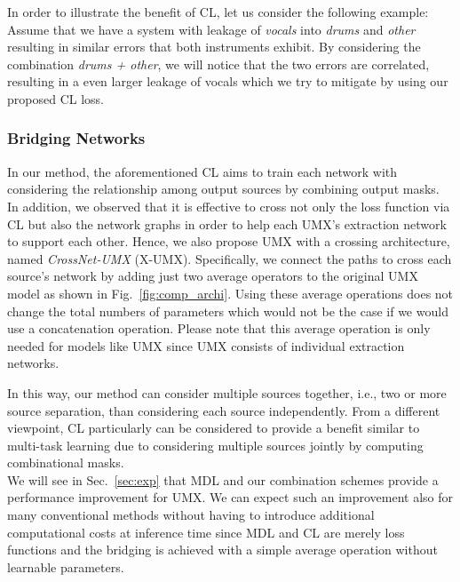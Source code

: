 \documentclass{article}
\begin{document}
In order to illustrate the benefit of CL, let us consider the following example: Assume that we have a system with leakage of \emph{vocals} into \emph{drums} and \emph{other} resulting in similar errors that both instruments exhibit. 
By considering the combination \emph{drums + other}, we will notice that the two errors are correlated, resulting in a even larger leakage of vocals which we try to mitigate by using our proposed CL loss.

\subsubsection{Bridging Networks}
\label{subsec:bridging}
In our method, the aforementioned CL aims to train each network with considering the relationship among output sources by combining output masks.
In addition, we observed that it is effective to cross not only the loss function via CL but also the network graphs in order to help each UMX's extraction network to support each other.
Hence, we also propose UMX with a crossing architecture, named \emph{CrossNet-UMX} (X-UMX).
Specifically, we connect the paths to cross each source's network by adding just two average operators to the original UMX model as shown in Fig.~\ref{fig:comp_archi}. 
Using these average operations does not change the total numbers of parameters which would not be the case if we would use a concatenation operation.
Please note that this average operation is only needed for models like UMX since UMX consists of individual extraction networks.


In this way, our method can consider multiple sources together, i.e., two or more source separation, than considering each source independently.
From a different viewpoint, CL particularly can be considered to provide a benefit similar to multi-task learning due to considering multiple sources jointly by computing combinational masks.
\\


We will see in Sec.~\ref{sec:exp} that MDL and our combination schemes provide a performance improvement for UMX. We can expect such an improvement also for many conventional methods without having to introduce additional computational costs at inference time since MDL and CL are merely loss functions and the bridging is achieved with a simple average operation without learnable parameters.
\end{document}
